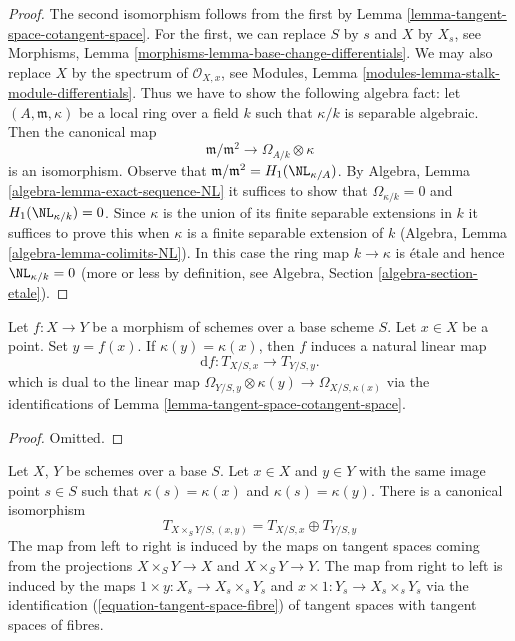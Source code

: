 \begin{proof}
The second isomorphism follows from the first by
Lemma \ref{lemma-tangent-space-cotangent-space}.
For the first, we can replace $S$ by $s$ and $X$ by $X_s$, see
Morphisms, Lemma \ref{morphisms-lemma-base-change-differentials}.
We may also replace $X$ by the spectrum of $\mathcal{O}_{X, x}$, see
Modules, Lemma \ref{modules-lemma-stalk-module-differentials}.
Thus we have to show the following algebra fact: let
$(A, \mathfrak m, \kappa)$ be a local ring over a field $k$
such that $\kappa/k$ is separable algebraic. Then the canonical map
$$
\mathfrak m/\mathfrak m^2
\longrightarrow
\Omega_{A/k} \otimes \kappa
$$
is an isomorphism. Observe that
$\mathfrak m/\mathfrak m^2 = H_1(\NL_{\kappa/A})$. By
Algebra, Lemma \ref{algebra-lemma-exact-sequence-NL}
it suffices to show that $\Omega_{\kappa/k} = 0$ and
$H_1(\NL_{\kappa/k}) = 0$. Since $\kappa$ is the union of
its finite separable extensions in $k$ it suffices to prove
this when $\kappa$ is a finite separable extension of $k$
(Algebra, Lemma \ref{algebra-lemma-colimits-NL}).
In this case the ring map $k \to \kappa$ is \'etale
and hence $\NL_{\kappa/k} = 0$ (more or less by definition, see
Algebra, Section \ref{algebra-section-etale}).
\end{proof}

\begin{lemma}
\label{lemma-map-tangent-spaces}
Let $f : X \to Y$ be a morphism of schemes over a base scheme $S$.
Let $x \in X$ be a point. Set $y = f(x)$. If $\kappa(y) = \kappa(x)$,
then $f$ induces a natural linear map
$$
\text{d}f : T_{X/S, x} \longrightarrow T_{Y/S, y}.
$$
which is dual to the linear map
$\Omega_{Y/S, y} \otimes \kappa(y) \to \Omega_{X/S, \kappa(x)}$
via the identifications of Lemma \ref{lemma-tangent-space-cotangent-space}.
\end{lemma}

\begin{proof}
Omitted.
\end{proof}

\begin{lemma}
\label{lemma-tangent-space-product}
Let $X$, $Y$ be schemes over a base $S$. Let $x \in X$ and $y \in Y$ with
the same image point $s \in S$ such that $\kappa(s) = \kappa(x)$ and
$\kappa(s) = \kappa(y)$. There is a canonical isomorphism
$$
T_{X \times_S Y/S, (x, y)} = T_{X/S, x} \oplus T_{Y/S, y}
$$
The map from left to right is induced by the maps on tangent spaces coming
from the projections $X \times_S Y \to X$ and $X \times_S Y \to Y$.
The map from right to left is induced by the maps
$1 \times y : X_s \to X_s \times_s Y_s$ and
$x \times 1 : Y_s \to X_s \times_s Y_s$ via the identification
(\ref{equation-tangent-space-fibre}) of
tangent spaces with tangent spaces of fibres.
\end{lemma}

